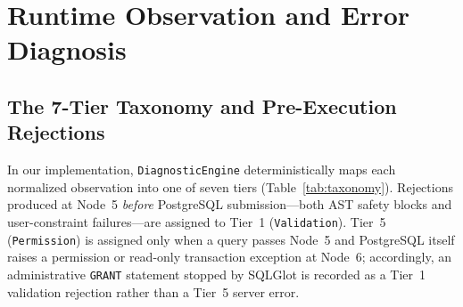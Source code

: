 \section{Runtime Observation and Error Diagnosis}
\subsection{The 7-Tier Taxonomy and Pre-Execution Rejections}
In our implementation, \texttt{DiagnosticEngine} deterministically maps each normalized observation into one of seven tiers (Table~\ref{tab:taxonomy}). Rejections produced at Node~5 \emph{before} PostgreSQL submission---both AST safety blocks and user-constraint failures---are assigned to Tier~1 (\texttt{Validation}). Tier~5 (\texttt{Permission}) is assigned only when a query passes Node~5 and PostgreSQL itself raises a permission or read-only transaction exception at Node~6; accordingly, an administrative \texttt{GRANT} statement stopped by SQLGlot is recorded as a Tier~1 validation rejection rather than a Tier~5 server error.

